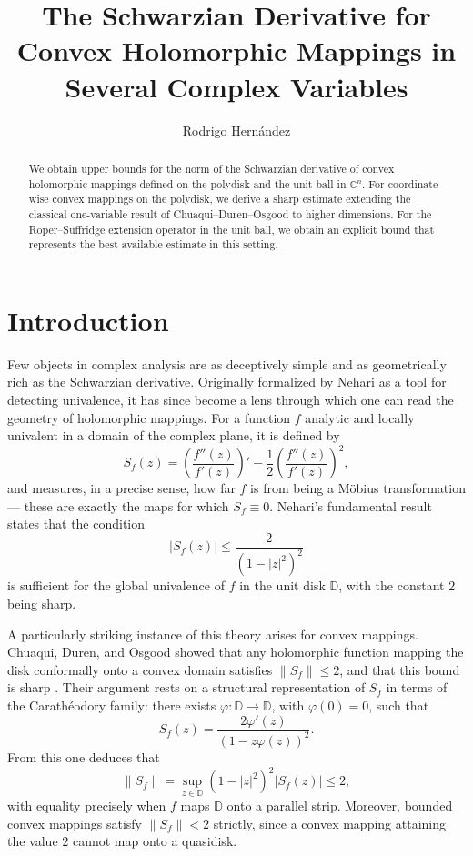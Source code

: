 \documentclass[12pt]{amsart}
\title[Schwarzian Derivative and Convexity]{The Schwarzian Derivative for Convex Holomorphic Mappings in Several Complex Variables}
\author{Rodrigo Hern\'andez}
\date{}
\theoremstyle{definition}
\theoremstyle{remark}
\numberwithin{equation}{section}
\begin{document}
\begin{abstract}
We obtain upper bounds for the norm of the Schwarzian derivative of convex
holomorphic mappings defined on the polydisk and the unit ball in
$\mathbb{C}^n$. For coordinate-wise convex mappings on the polydisk, we derive
a sharp estimate extending the classical one-variable result of
Chuaqui--Duren--Osgood to higher dimensions. For the Roper--Suffridge
extension operator in the unit ball, we obtain an explicit bound that
represents the best available estimate in this setting. 
\end{abstract}

 
\maketitle


\section*{Introduction}

Few objects in complex analysis are as deceptively simple and as geometrically
rich as the Schwarzian derivative. Originally formalized by Nehari as a tool
for detecting univalence, it has since become a lens through which one can
read the geometry of holomorphic mappings. For a function $f$ analytic and
locally univalent in a domain of the complex plane, it is defined by
\[
S_f(z) = \left( \frac{f''(z)}{f'(z)} \right)' - \frac{1}{2}
\left( \frac{f''(z)}{f'(z)} \right)^2,
\]
and measures, in a precise sense, how far $f$ is from being a M\"{o}bius
transformation --- these are exactly the maps for which $S_f \equiv 0$.
Nehari's fundamental result \cite{nehari1949} states that the condition
\[
|S_f(z)| \leq \frac{2}{(1 - |z|^2)^2}
\]
is sufficient for the global univalence of $f$ in the unit disk $\mathbb{D}$,
with the constant $2$ being sharp.

A particularly striking instance of this theory arises for convex mappings.
Chuaqui, Duren, and Osgood showed that any holomorphic function mapping the
disk conformally onto a convex domain satisfies $\|S_f\| \leq 2$, and that
this bound is sharp \cite{chuaqui2011}. Their argument rests on a structural
representation of $S_f$ in terms of the Carath\'{e}odory family: there exists
$\varphi:\mathbb{D}\to\mathbb{D}$, with $\varphi(0)=0$, such that
\[
S_f(z) = \frac{2\varphi'(z)}{(1 - z\varphi(z))^2}.
\]
From this one deduces that
\[
\|S_f\| = \sup_{z \in \mathbb{D}} (1 - |z|^2)^2 |S_f(z)| \leq 2,
\]
with equality precisely when $f$ maps $\mathbb{D}$ onto a parallel strip.
Moreover, bounded convex mappings satisfy $\|S_f\| < 2$ strictly, since a
convex mapping attaining the value $2$ cannot map onto a quasidisk.
\end{document}
